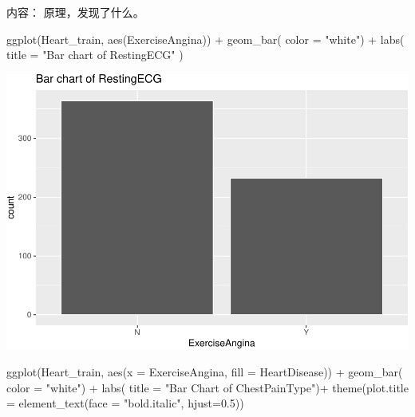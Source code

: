 \documentclass[
]{article}
\newenvironment{Shaded}{\begin{snugshade}}{\end{snugshade}}
\newcommand{\AttributeTok}[1]{\textcolor[rgb]{0.77,0.63,0.00}{#1}}
\newcommand{\FloatTok}[1]{\textcolor[rgb]{0.00,0.00,0.81}{#1}}
\newcommand{\FunctionTok}[1]{\textcolor[rgb]{0.00,0.00,0.00}{#1}}
\newcommand{\NormalTok}[1]{#1}
\newcommand{\SpecialCharTok}[1]{\textcolor[rgb]{0.00,0.00,0.00}{#1}}
\newcommand{\StringTok}[1]{\textcolor[rgb]{0.31,0.60,0.02}{#1}}
\begin{document}
内容： 原理，发现了什么。

\begin{Shaded}
\begin{Highlighting}[]
\FunctionTok{ggplot}\NormalTok{(Heart\_train, }\FunctionTok{aes}\NormalTok{(ExerciseAngina)) }\SpecialCharTok{+}
  \FunctionTok{geom\_bar}\NormalTok{( }\AttributeTok{color =} \StringTok{"white"}\NormalTok{) }\SpecialCharTok{+}
  \FunctionTok{labs}\NormalTok{(}
    \AttributeTok{title =} \StringTok{"Bar chart of RestingECG"}
\NormalTok{  )}
\end{Highlighting}
\end{Shaded}

\includegraphics{PSTAT-131--FINAL-PROJECT-_YIFAN-XU_files/figure-latex/unnamed-chunk-17-1.pdf}

\begin{Shaded}
\begin{Highlighting}[]
 \FunctionTok{ggplot}\NormalTok{(Heart\_train, }\FunctionTok{aes}\NormalTok{(}\AttributeTok{x =}\NormalTok{ ExerciseAngina, }\AttributeTok{fill =}\NormalTok{ HeartDisease)) }\SpecialCharTok{+}
  \FunctionTok{geom\_bar}\NormalTok{( }\AttributeTok{color =} \StringTok{"white"}\NormalTok{) }\SpecialCharTok{+}
  \FunctionTok{labs}\NormalTok{(}
    \AttributeTok{title =} \StringTok{"Bar Chart of ChestPainType"}\NormalTok{)}\SpecialCharTok{+}
  \FunctionTok{theme}\NormalTok{(}\AttributeTok{plot.title =} \FunctionTok{element\_text}\NormalTok{(}\AttributeTok{face =} \StringTok{"bold.italic"}\NormalTok{, }\AttributeTok{hjust=}\FloatTok{0.5}\NormalTok{))}
\end{Highlighting}
\end{Shaded}
\end{document}
